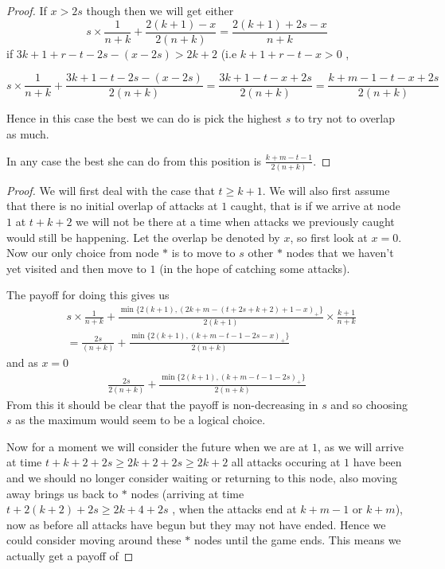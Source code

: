 \documentclass[a4paper,10pt]{article}
\newcommand{\pospart}[1]{\left( #1 \right)_{+}}
\theoremstyle{definition}
\theoremstyle{definition}
\theoremstyle{remark}
\theoremstyle{definition}
\begin{document}
\begin{proof}
If $x > 2s$ though then we will get either
$$s \times \frac{1}{n+k} + \frac{2(k+1)-x}{2(n+k)}=\frac{2(k+1)+2s-x}{n+k}$$ if $3k+1+r-t-2s-(x-2s) > 2k+2$ (i.e $k+1+r-t-x > 0$ ,

$$s \times \frac{1}{n+k} + \frac{3k+1-t-2s-(x-2s)}{2(n+k)}=\frac{3k+1-t-x+2s}{2(n+k)}=\frac{k+m-1-t-x+2s}{2(n+k)} $$

Hence in this case the best we can do is pick the highest $s$ to try not to overlap as much.

In any case the best she can do from this position is $\frac{k+m-t-1}{2(n+k)}$.
\end{proof}

\begin{proof}
We will first deal with the case that $t \geq k+1$. We will also first assume that there is no initial overlap of attacks at $1$ caught, that is if we arrive at node $1$ at $t+k+2$ we will not be there at a time when attacks we previously caught would still be happening.
Let the overlap be denoted by $x$, so first look at $x=0$. Now our only choice from node $*$ is to move to $s$ other $*$ nodes that we haven't yet visited and then move to $1$ (in the hope of catching some attacks).

The payoff for doing this gives us
\begin{align*}
&s \times \frac{1}{n+k} +\frac{\min \{ 2(k+1), \pospart{2k+m-(t+2s+k+2)+1-x} \}}{2(k+1)} \times \frac{k+1}{n+k} \\
&=\frac{2s}{(n+k)} +\frac{\min \{ 2(k+1), \pospart{k+m-t-1-2s-x} \}}{2(n+k)} 
\end{align*}
and as $x=0$
\begin{align*}
\frac{2s}{2(n+k)} +\frac{\min \{ 2(k+1), \pospart{k+m-t-1-2s} \}}{2(n+k)} 
\end{align*}
From this it should be clear that the payoff is non-decreasing in $s$ and so choosing $s$ as the maximum would seem to be a logical choice.

Now for a moment we will consider the future when we are at $1$, as we will arrive at time $t+k+2+2s \geq 2k+2+2s \geq 2k+2$ all attacks occuring at $1$ have been and we should no longer consider waiting or returning to this node, also moving away brings us back to $*$ nodes (arriving at time $t+2(k+2)+2s \geq 2k+4+2s$ , when the attacks end at $k+m-1$ or $k+m$), now as before all attacks have begun but they may not have ended. Hence we could consider moving around these $*$ nodes until the game ends. This means we actually get a payoff of


\end{proof}
\end{document}

